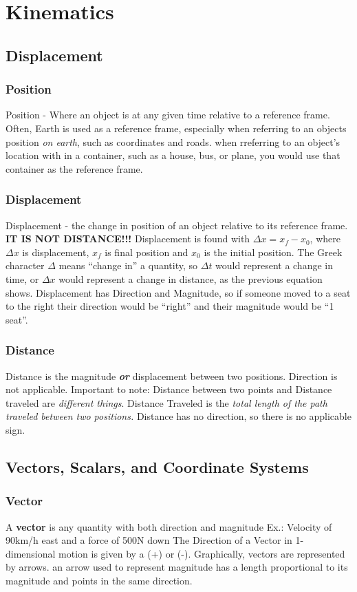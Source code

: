 \documentclass{article}
\begin{document}
\section{Kinematics}
\subsection{Displacement}
\subsubsection{Position}
Position - Where an object is at any given time relative to a reference frame.
Often, Earth is used as a reference frame, especially when referring to an objects position \emph{on earth}, such as coordinates and roads.
when rreferring to an object's location with in a container, such as a house, bus, or plane, you would use that container as the reference frame.
\subsubsection{Displacement}
Displacement - the change in position of an object relative to its reference frame. \textbf{IT IS NOT DISTANCE!!!}
Displacement is found with $\Delta{x} = x_f - x_0$, where $\Delta{x}$ is displacement, $x_f$ is final position and $x_0$ is the initial position.
The Greek character $\Delta$ means ``change in'' a quantity, so $\Delta{t}$ would represent a change in time, or $\Delta{x}$ would represent a change in distance, as the previous equation shows.
Displacement has Direction and Magnitude, so if someone moved to a seat to the right their direction would be ``right'' and their magnitude would be ``1 seat''.
\subsubsection{Distance}
Distance is the magnitude \textbf{\emph{or}} displacement between two positions. Direction is not applicable.
Important to note: Distance between two points and Distance traveled are \emph{different things}. Distance Traveled is the \emph{total length of the path traveled between two positions.}
Distance has no direction, so there is no applicable sign.

\subsection{Vectors, Scalars, and Coordinate Systems}
\subsubsection{Vector}
A \textbf{vector} is any quantity with both direction and magnitude
Ex.: Velocity of 90km/h east and a force of 500N down
The Direction of a Vector in 1-dimensional motion is given by a (+) or (-). Graphically, vectors are represented by arrows. an arrow used to represent magnitude has a length proportional to its magnitude and points in the same direction.
\end{document}
